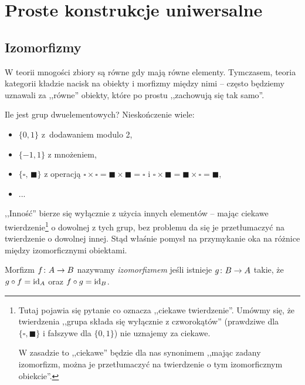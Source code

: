 \section{Proste konstrukcje uniwersalne}
\subsection{Izomorfizmy}
\begin{idea}
  W teorii mnogości zbiory są równe gdy mają równe elementy. Tymczasem, teoria kategorii kładzie nacisk na obiekty i morfizmy między nimi -- często będziemy uznawali za ,,równe'' obiekty, które po prostu ,,zachowują się tak samo''.
\end{idea}

\begin{exmp}
  Ile jest grup dwuelementowych? Nieskończenie wiele:
  \begin{itemize}
    \item $\{0, 1\}$ z~dodawaniem modulo 2,
    \item $\{-1, 1\}$ z mnożeniem,
    \item $\{\square,\,\blacksquare\}$ z operacją $\square \times \square = \blacksquare \times \blacksquare = \square$ i $\square \times \blacksquare = \blacksquare\times \square = \blacksquare$,
    \item ... %
  \end{itemize}

  ,,Inność'' bierze się wyłącznie z użycia innych elementów -- mając ciekawe twierdzenie\footnote{Tutaj pojawia się pytanie co oznacza ,,ciekawe twierdzenie''. Umówmy się, że twierdzenia ,,grupa składa się wyłącznie z czworokątów'' (prawdziwe dla $\{\square, \blacksquare\}$ i fałszywe dla $\{0, 1\}$) nie uznajemy za ciekawe.

  W zasadzie to ,,ciekawe'' będzie dla nas synonimem ,,mając zadany izomorfizm, można je przetłumaczyć na twierdzenie o tym izomorficznym obiekcie''.} o dowolnej z tych grup, bez problemu da się je przetłumaczyć na twierdzenie o dowolnej innej. Stąd właśnie pomysł na przymykanie oka na różnice między izomorficznymi obiektami.
\end{exmp}

\begin{defn}
  \label{defn:izomorfizm}
  Morfizm $f\colon A\to B$ nazywamy \emph{izomorfizmem} jeśli istnieje $g\colon B\to A$ takie, że $g\circ f = \mathrm{id}_{A}$ oraz $f\circ g = \mathrm{id}_{B}$.
\end{defn}

